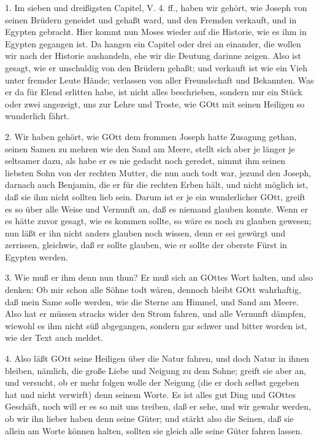 1. Im sieben und dreißigsten Capitel, V. 4. ff., haben wir gehört, wie Joseph von seinen Brüdern geneidet und gehaßt ward, und den Fremden verkauft, und in Egypten gebracht. Hier kommt nun Moses wieder auf die Historie, wie es ihm in Egypten gegangen ist. Da hangen ein Capitel oder drei an einander, die wollen wir nach der Historie aushandeln, ehe wir die Deutung darinne zeigen. Also ist gesagt, wie er unschuldig von den Brüdern gehaßt; und verkauft ist wie ein Vieh unter fremder Leute Hände; verlassen von aller Freundschaft und Bekannten. Was er da für Elend erlitten habe, ist nicht alles beschrieben, sondern nur ein Stück oder zwei angezeigt, uns zur Lehre und Troste, wie GOtt mit seinen Heiligen so wunderlich fährt.

2. Wir haben gehört, wie GOtt dem frommen Joseph hatte Zusagung gethan, seinen Samen zu mehren wie den Sand am Meere, stellt sich aber je länger je seltsamer dazu, als habe er es nie gedacht noch geredet, nimmt ihm seinen liebsten Sohn von der rechten Mutter, die nun auch todt war, jezund den Joseph, darnach auch Benjamin, die er für die rechten Erben hält, und nicht möglich ist, daß sie ihm nicht sollten lieb sein. Darum ist er je ein wunderlicher GOtt, greift es so über alle Weise und Vernunft an, daß es niemand glauben konnte. Wenn er es hätte zuvor gesagt, wie es kommen sollte, so wäre es noch zu glauben gewesen; nun läßt er ihn nicht anders glauben noch wissen, denn er sei gewürgt und zerrissen, gleichwie, daß er sollte glauben, wie er sollte der oberste Fürst in Egypten werden.

3. Wie muß er ihm denn nun thun? Er muß sich an GOttes Wort halten, und also denken: Ob mir schon alle Söhne todt wären, dennoch bleibt GOtt wahrhaftig, daß mein Same solle werden, wie die Sterne am Himmel, und Sand am Meere. Also hat er müssen stracks wider den Strom fahren, und alle Vernunft dämpfen, wiewohl es ihm nicht süß abgegangen, sondern gar schwer und bitter worden ist, wie der Text auch meldet.

4. Also läßt GOtt seine Heiligen über die Natur fahren, und doch Natur in ihnen bleiben, nämlich, die große Liebe und Neigung zu dem Sohne; greift sie aber an, und versucht, ob er mehr folgen wolle der Neigung (die er doch selbst gegeben hat und nicht verwirft) denn seinem Worte. Es ist alles gut Ding und GOttes Geschäft, noch will er es so mit uns treiben, daß er sehe, und wir gewahr werden, ob wir ihn lieber haben denn seine Güter; und stärkt also die Seinen, daß sie allein am Worte können halten, sollten sie gleich alle seine Güter fahren lassen.

